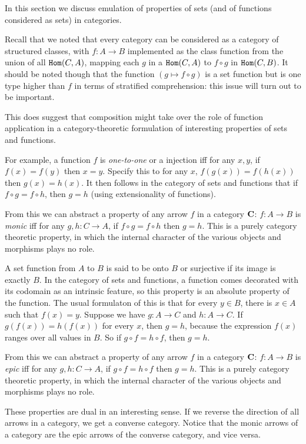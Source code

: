 \documentclass[12pt]{article}
\begin{document}
In this section we discuss emulation of properties of sets (and of functions considered as sets) in categories.

Recall that we noted that every category can be considered as a category of structured classes, with $f:A \rightarrow B$ implemented as the class function from the union of all ${\tt Hom}(C,A)$, mapping each $g$ in a ${\tt Hom}(C,A)$ to $f \circ g$ in ${\tt Hom}(C,B)$.  It should be noted though that the function $(g \mapsto f \circ g)$ is a set function but is one type higher than $f$
in terms of stratified comprehension:  this issue will  turn out to be important.

This does suggest that composition might take over the role of function application in a category-theoretic formulation of interesting properties of sets and functions.

For example, a function $f$ is {\em one-to-one\/} or a injection iff for any $x,y$, if $f(x) = f(y)$ then $x=y$.  Specify this to for any $x$,  $f(g(x)) = f(h(x))$ then $g(x)=h(x)$.  It then follows in the category of sets and functions that if $f \circ g = f \circ h$, then $g=h$ (using extensionality of functions).

From this we can abstract a property of any arrow $f$ in a category ${\bf C}$:  $f:A \rightarrow B$ is {\em monic\/} iff for any $g,h:C \rightarrow A$, if $f \circ g = f \circ h$ then $g=h$.  This is a purely category theoretic property, in which the internal character of the various objects and morphisms plays no role.

A set function from $A$ to $B$ is said to be onto $B$ or surjective if its image is exactly $B$.  In the category of sets and functions, a function comes decorated with its codomain as an intrinsic feature, so this property is an absolute property of the function.  The usual formulaton of this is that for every $y \in B$, there is $x \in A$ such that
$f(x) = y$.  Suppose we have $g:A \rightarrow C$ and $h:A \rightarrow C$.  If $g(f(x)) = h(f(x))$ for every $x$, then $g=h$, because the expression $f(x)$ ranges over all values in $B$.  So if $g \circ f = h \circ f$, then $g=h$.

From this we can abstract a property of any arrow $f$ in a category ${\bf C}$:  $f:A \rightarrow B$ is {\em epic\/} iff for any $g,h:C \rightarrow A$, if $g \circ f = h \circ f$ then $g=h$.  This is a purely category theoretic property, in which the internal character of the various objects and morphisms plays no role.

These properties are dual in an interesting sense.  If we reverse the direction of all arrows in a category, we get a converse category.  Notice that the monic arrows of a category are the epic arrows of the converse category, and vice versa.
\end{document}
